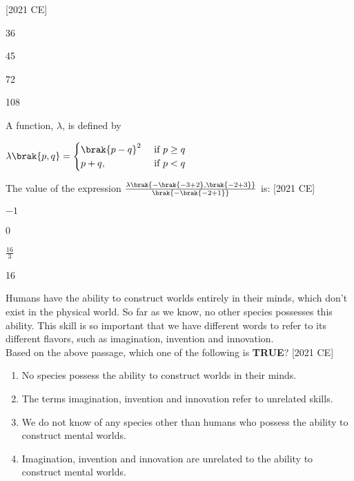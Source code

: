 \hfill [2021 CE]
\begin{enumerate}
    \begin{multicols}{2}
        \item 36
        \item 45 
        \item 72
        \item 108
    \end{multicols}
\end{enumerate}
\item A function, $\lambda$, is defined by
\begin{center}
    $\lambda\brak{p,q} =
    \begin{cases}
        \brak{p-q}^2 & \text{ if } p \geq q \\
        p + q, & \text{ if } p < q
    \end{cases}$
\end{center}
The value of the expression $\frac{\lambda\brak{-\brak{-3+2}, \brak{-2 + 3}}}{\brak{-\brak{-2 +1}}}$ is: \hfill [2021 CE]
\begin{enumerate}
    \begin{multicols}{2}
    \item $-1$
        \item 0
        \item $\frac{16}{3}$
        \item 16
    \end{multicols}
\end{enumerate}
\item Humans have the ability to construct worlds entirely in their minds, which
don't exist in the physical world. So far as we know, no other species
possesses this ability. This skill is so important that we have different words
to refer to its different flavors, such as imagination, invention and
innovation.\\
Based on the above passage, which one of the following is \textbf{TRUE}? \hfill [2021 CE]
\begin{enumerate}
    \item No species possess the ability to construct worlds in their minds.
    \item The terms imagination, invention and innovation refer to unrelated skills.
    \item We do not know of any species other than humans who possess the ability to
construct mental worlds.
\item Imagination, invention and innovation are unrelated to the ability to construct
mental worlds.
\end{enumerate}
